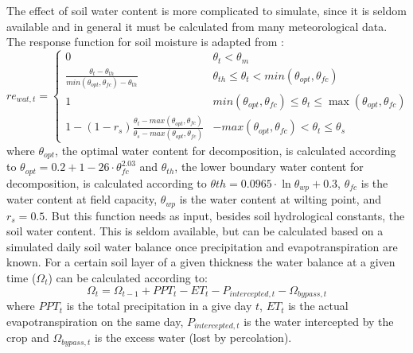 \documentclass[review]{elsarticle}
\begin{document}
The effect of soil water content is more complicated to simulate, since it is seldom available and in general it must be calculated from many meteorological data. The response function for soil moisture is adapted from \cite{Moyano2013}: 
\begin{equation*}
re_{wat,t} = \begin{cases}
0
&\theta_t< \theta_m\\

\frac{\theta_t-\theta_{th}}{min(\theta_{opt},\theta_{fc})-\theta_{th}} 
&\theta_{th} \leq \theta_t < min(\theta_{opt},\theta_{fc}) \\

1 & min(\theta_{opt},\theta_{fc}) \leq \theta_t \leq \max(\theta_{opt},\theta_{fc})\\

1-(1-r_s)\frac{\theta_t-max(\theta_{opt},\theta_{fc})}{\theta_s-max(\theta_{opt},\theta_{fc})} &  -max(\theta_{opt},\theta_{fc})< \theta_t \leq \theta_s

\end{cases}
\label{equation:rewat}
\end{equation*}
where $\theta_{opt}$, the optimal water content for decomposition, is calculated according to $\theta_{opt}=0.2+1-26 \cdot \theta_{fc}^{2.03}$ and $\theta_{th}$, the lower boundary water content for decomposition, is calculated according to $\theta{th}=0.0965 \cdot \ln{\theta_{wp}}+0.3$, $\theta_{fc}$ is the water content at field capacity, $\theta_{wp}$ is the water content at wilting point, and $r_s=0.5$. But this function needs as input, besides soil hydrological constants, the soil water content. This is seldom available, but can be calculated based on a simulated daily soil water balance once precipitation and evapotranspiration are known. For a certain soil layer of a given thickness the water balance at a given time ($\Omega_t$) can be calculated according to:
\begin{equation}
\Omega_t= \Omega_{t-1}+PPT_t-ET_t-P_{intercepted, t}-\Omega_{bypass, t}
\label{equation:waterbal}
\end{equation}
where $PPT_t$ is the total precipitation in a give day $t$, $ET_t$ is the actual evapotranspiration on the same day, $P_{intercepted, t}$ is the water intercepted by the crop and $\Omega_{bypass, t}$ is the excess water (lost by percolation). 
\end{document}
